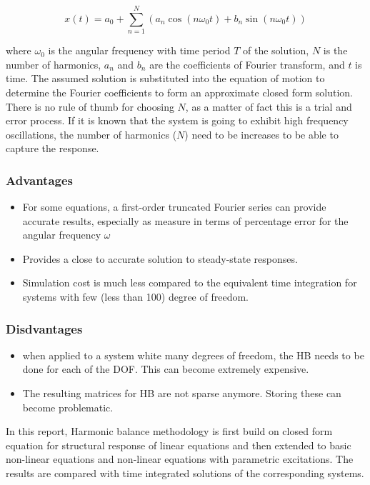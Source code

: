 \documentclass[12pt, a4paper]{extarticle}
\begin{document}
\begin{equation}
x(t) = a_0+\sum\limits_{n=1}^N (a_n \cos(n\omega_0 t)+b_n \sin(n \omega_0 t))
\end{equation}

where $\omega_0$ is the angular frequency with time period $T$ of the solution, $N$ is the number of harmonics, $a_n$ and $b_n$ are the coefficients of Fourier transform, and $t$ is time. The assumed solution is substituted into the equation of motion to determine the Fourier coefficients to form an approximate closed form solution. There is no rule of thumb for choosing $N$, as a matter of fact this is a trial and error process. If it is known that the system is going to exhibit high frequency oscillations, the number of harmonics ($N$) need to be increases to be able to capture the response.

\subsubsection{Advantages}
\begin{itemize}
\item{For some equations, a first-order truncated Fourier series can provide accurate results, especially as measure in terms of percentage error for the angular frequency $\omega$}
\item{Provides a close to accurate solution to steady-state responses.}
\item Simulation cost is much less compared to the equivalent time integration for systems with few (less than 100) degree of freedom.
\end{itemize}

\subsubsection{Disdvantages}
\begin{itemize}
\item when applied to a system white many degrees of freedom, the HB needs to be done for each of the DOF. This can become extremely expensive.
\item The resulting matrices for HB are not sparse anymore. Storing these can become problematic.
\end{itemize}

In this report, Harmonic balance methodology is first build on closed form equation for structural response of linear equations and then extended to basic non-linear equations and non-linear equations with parametric excitations. The results are compared with time integrated solutions of the corresponding systems.
\end{document}
